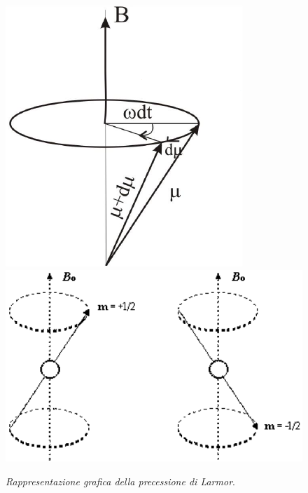 \documentclass{report}
\numberwithin{equation}{section}
\numberwithin{figure}{section}
\begin{document}
\begin{figure}[htp]
\centering
\includegraphics[scale=0.77]{immagini/larmor.png}\quad\includegraphics[scale=0.78]{immagini/precessione.png}
\caption{\label{fig:larmor} \textit{Rappresentazione grafica della precessione di Larmor}.}
\end{figure}
\end{document}
